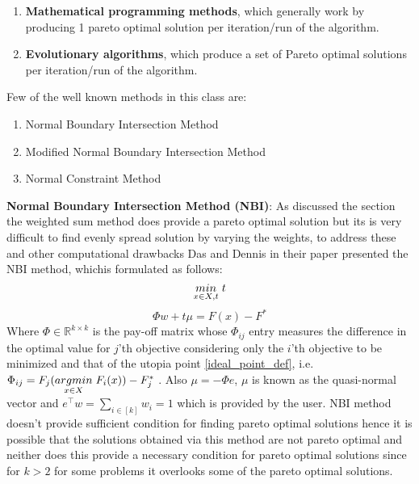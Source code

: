 \begin{enumerate}
    \item \textbf{Mathematical programming methods}, which generally work by producing 1 pareto optimal solution per iteration/run of the algorithm.
    \item \textbf{Evolutionary algorithms}, which produce a set of Pareto optimal solutions per iteration/run of the algorithm.
\end{enumerate}

Few of the well known methods in this class are:
\begin{enumerate}
    \item Normal Boundary Intersection Method
    \item Modified Normal Boundary Intersection Method
    \item Normal Constraint Method
\end{enumerate} 
\textbf{Normal Boundary Intersection Method (NBI)}: \label{nbi_method_def}
As discussed the section \label{lin_utility_model} the weighted sum method does provide a pareto optimal solution but its is very difficult to find evenly spread solution by varying the weights, to address these and other computational drawbacks Das and Dennis in their paper \cite{das1998normal} presented the NBI method, whichis formulated as follows:
\begin{equation} \label{nbi_obj}
    \underset{x\in X, t}{min} \hspace{1mm} t
\end{equation}
\begin{equation}
    \Phi w + t \mu = F(x) - F^{*}
\end{equation}
Where $\Phi \in \mathbb{R}^{k\times k}$ is the pay-off matrix whose $\Phi_{ij}$ entry measures the difference in the optimal value for $j$'th objective considering only the $i$'th objective to be minimized and that of the utopia point \ref{ideal_point_def}, i.e. $\Phi_{ij} = F_j(\underset{x\in X}{argmin}\hspace{1mm} F_i(x))-F^{*}_j$ . Also $\mu = - \Phi e$, $\mu$ is known as the quasi-normal vector and $e^{\top}w=\sum_{i\in [k]} w_i = 1$ which is provided by the user. NBI method doesn't provide sufficient condition for finding pareto optimal solutions hence it is possible that the solutions obtained via this method are not pareto optimal and neither does this provide a necessary condition for pareto optimal solutions since for $k>2$ for some problems it overlooks some of the pareto optimal solutions.
